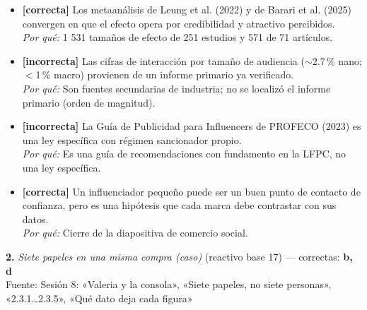 \documentclass[10pt,letterpaper]{article}
\begin{document}
\begin{itemize}[leftmargin=1.2em,itemsep=0pt,topsep=1pt,parsep=0pt]
\item[\textbf{a)}] {\footnotesize \textbf{[correcta]} Los metaanálisis de Leung et al. (2022) y de Barari et al. (2025) convergen en que el efecto opera por credibilidad y atractivo percibidos.\\ \textit{Por qué:} 1 531 tamaños de efecto de 251 estudios y 571 de 71 artículos.}
\item[\textbf{b)}] {\footnotesize \textbf{[incorrecta]} Las cifras de interacción por tamaño de audiencia (${\sim}$2.7\,\% nano; $<$1\,\% macro) provienen de un informe primario ya verificado.\\ \textit{Por qué:} Son fuentes secundarias de industria; no se localizó el informe primario (orden de magnitud).}
\item[\textbf{c)}] {\footnotesize \textbf{[incorrecta]} La Guía de Publicidad para Influencers de PROFECO (2023) es una ley específica con régimen sancionador propio.\\ \textit{Por qué:} Es una guía de recomendaciones con fundamento en la LFPC, no una ley específica.}
\item[\textbf{d)}] {\footnotesize \textbf{[correcta]} Un influenciador pequeño puede ser un buen punto de contacto de confianza, pero es una hipótesis que cada marca debe contrastar con sus datos.\\ \textit{Por qué:} Cierre de la diapositiva de comercio social.}
\end{itemize}
\vspace{3pt}\noindent\textbf{2.} \textit{Siete papeles en una misma compra (caso)} (reactivo base 17) — correctas: \textbf{b, d}\\[-1pt]
{\scriptsize Fuente: Sesión 8: «Valeria y la consola», «Siete papeles, no siete personas», «2.3.1…2.3.5», «Qué dato deja cada figura»}
\end{document}
